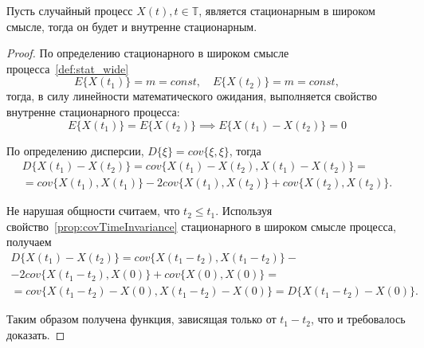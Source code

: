 \begin{Theorem}
	Пусть случайный процесс $ X(t), t \in \mathbb{T} $, является стационарным в широком смысле, тогда он будет и внутренне стационарным.
\end{Theorem}
\begin{proof}

По определению стационарного в широком смысле процесса~\eqref{def:stat_wide}
\begin{equation*}
	E \{ X(t_1) \} = m = const, \quad E \{ X(t_2) \} = m = const,
\end{equation*}
тогда, в силу линейности математического ожидания, выполняется свойство внутренне стационарного процесса:
\begin{equation*}
	E \{ X(t_1) \} = E \{ X(t_2) \} \implies E \{ X(t_1) - X(t_2) \} = 0
\end{equation*}

По определению дисперсии, $ D\{\xi\} = cov\{\xi, \xi\} $, тогда
\begin{equation*}\begin{gathered}
	D\{X(t_1) - X(t_2)\} = cov\{X(t_1) - X(t_2), X(t_1) - X(t_2)\} = \\
	= cov\{X(t_1), X(t_1)\} - 2cov\{X(t_1), X(t_2)\} + cov\{X(t_2), X(t_2)\}.
\end{gathered}\end{equation*}

Не нарушая общности считаем, что $ t_2 \le t_1 $. Используя свойство~\ref{prop:covTimeInvariance} стационарного в широком смысле процесса, получаем
\begin{equation*}\begin{gathered}
	D\{X(t_1) - X(t_2)\} = cov\{X(t_1 - t_2), X(t_1 - t_2)\} - \\
	- 2cov\{X(t_1 - t_2), X(0)\} + cov\{X(0), X(0)\} = \\
	= cov\{X(t_1 - t_2) - X(0), X(t_1 - t_2) - X(0)\} = D\{X(t_1 - t_2) - X(0)\}.
\end{gathered}\end{equation*}

Таким образом получена функция, зависящая только от $ t_1 - t_2 $, что и требовалось доказать.
\end{proof}

